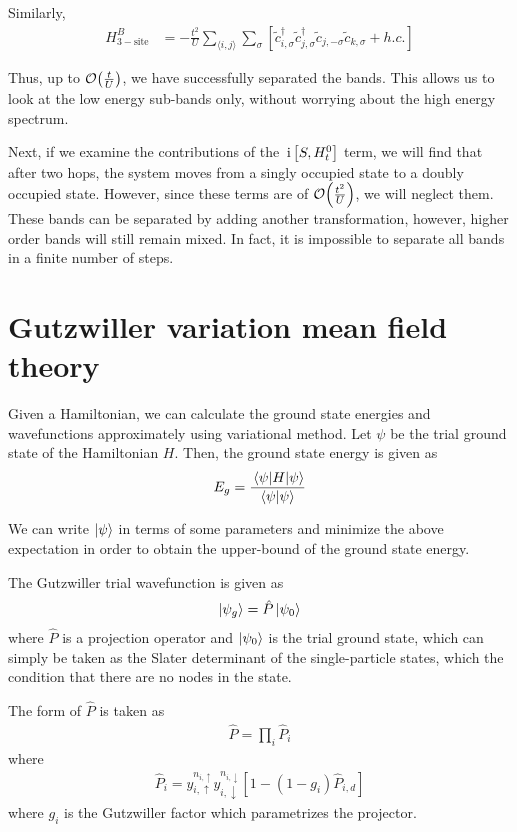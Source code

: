 \documentclass[]{report}
\newcommand{\I}{\,\mathrm{i}\,}
\begin{document}
Similarly,
\begin{align}
H^{B}_{\mathrm{3-site}} &= 
-\frac{t^2}{U} \sum_{\langle i,j \rangle } \sum_\sigma \left[ \tilde{c}^{\dagger}_{i, \sigma} \tilde{c}^{\dagger}_{j, \sigma} \tilde{c}_{j, -\sigma} \tilde{c}_{k, \sigma} + h.c. \right]
\end{align}

Thus, up to $ \order{\frac{t}{U}} $, we have successfully separated the bands. This allows us to look at the low energy sub-bands only, without worrying about the high energy spectrum.

Next, if we examine the contributions of the $ \I \comm{S}{H^{0}_{t}} $ term, we will find that after two hops, the system moves from a singly occupied state to a doubly occupied state. However, since these terms are of $ \order{\frac{t^2}{U}} $, we will neglect them. These bands can be separated by adding another transformation, however, higher order bands will still remain mixed. In fact, it is impossible to separate all bands in a finite number of steps.

\section{Gutzwiller variation mean field theory}
Given a Hamiltonian, we can calculate the ground state energies and  wavefunctions approximately using variational method. Let $ \psi $ be the trial ground state of the Hamiltonian $ H $. Then, the ground state energy is given as
\begin{align}
E_{g} = \frac{ \expval{H}{\psi} }{ \ip{\psi} }
\end{align}

We can write $ \ket{\psi} $ in terms of some parameters and minimize the above expectation in order to obtain the upper-bound of the ground state energy.

The Gutzwiller trial wavefunction is given as
\begin{align}
\ket{\psi_g} = \hat{P} \ket{\psi_0}
\end{align}
where $ \hat{P} $ is a projection operator and $ \ket{\psi_0} $ is the trial ground state, which can simply be taken as the Slater determinant of the single-particle states, which the condition that there are no nodes in the state.

The form of $ \hat{P} $ is taken as \cite{PhysRevLett.10.159}
\begin{align}
\hat{P} = \prod_{i} \hat{P}_i
\end{align}
where
\begin{align}
\hat{P}_i = y^{n_ {i, \uparrow} }_{i, \uparrow} y^{n_ {i, \downarrow} }_{i, \downarrow} \left[ 1 - \left( 1 - g_i \right) \hat{P}_{i, d} \right]
\end{align}
where $ g_i $ is the Gutzwiller factor which parametrizes the projector.
\end{document}
